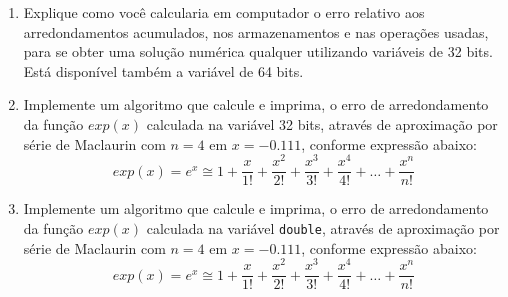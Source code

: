 \documentclass[12pt]{article}
\newenvironment{smallitem}{
    \vspace{-2mm}
    \begin{enumerate}
    \setlength{\parskip}{0pt}
    \setlength{\itemsep}{2pt}
}{
    \vspace{-2mm}
    \end{enumerate}
}
\begin{document}
\begin{enumerate}[label=\textbf{\arabic*})]
\begin{smallitem}
\end{smallitem}

\item Explique como você calcularia em computador o erro relativo aos
arredondamentos acumulados, nos armazenamentos e nas operações usadas, para se
obter uma solução numérica qualquer utilizando variáveis de 32 bits. Está
disponível também a variável de 64 bits.

\item Implemente um algoritmo que calcule e imprima, o erro de arredondamento da
função $exp(x)$ calculada na variável 32 bits, através de aproximação por série
de Maclaurin com $n = 4$ em $x = -0.111$, conforme expressão abaixo:
\begin{equation*}
exp(x) = e^x \cong 1 + \frac{x}{1!} + \frac{x^2}{2!} + \frac{x^3}{3!} +
\frac{x^4}{4!} + \dots + \frac{x^n}{n!}
\end{equation*}

\item Implemente um algoritmo que calcule e imprima, o erro de arredondamento da
função $exp(x)$ calculada na variável \verb!double!, através de aproximação por
série de Maclaurin com $n = 4$ em $x = -0.111$, conforme expressão abaixo:
\begin{equation*}
exp(x) = e^x \cong 1 + \frac{x}{1!} + \frac{x^2}{2!} + \frac{x^3}{3!} +
\frac{x^4}{4!} + \dots + \frac{x^n}{n!}
\end{equation*}

\end{enumerate}
\end{document}
